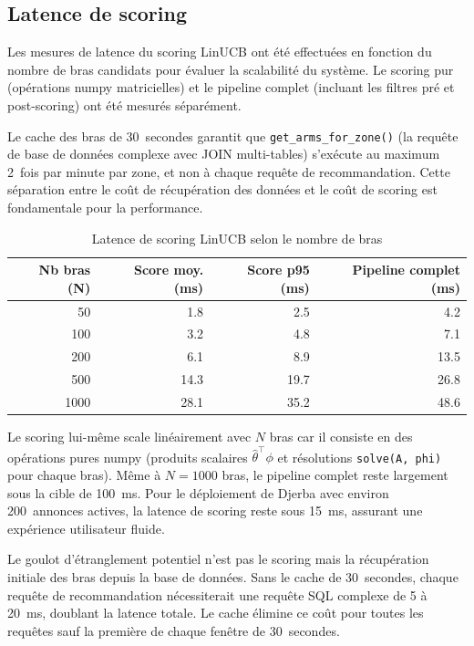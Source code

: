 \subsection{Latence de scoring}

Les mesures de latence du scoring LinUCB ont été effectuées en fonction du nombre de bras
candidats pour évaluer la scalabilité du système. Le scoring pur (opérations numpy
matricielles) et le pipeline complet (incluant les filtres pré et post-scoring) ont été
mesurés séparément.

Le cache des bras de 30~secondes garantit que \texttt{get\_arms\_for\_zone()} (la requête
de base de données complexe avec JOIN multi-tables) s'exécute au maximum 2~fois par minute
par zone, et non à chaque requête de recommandation. Cette séparation entre le coût de
récupération des données et le coût de scoring est fondamentale pour la performance.

\begin{table}[H]
    \centering
    \caption{Latence de scoring LinUCB selon le nombre de bras}
    \label{tab:scoring_latency}
    \small
    \begin{tabular}{r r r r}
        \toprule
        \textbf{Nb bras (N)} & \textbf{Score moy. (ms)} &
        \textbf{Score p95 (ms)} & \textbf{Pipeline complet (ms)} \\
        \midrule
        50 & 1.8 & 2.5 & 4.2 \\
        100 & 3.2 & 4.8 & 7.1 \\
        200 & 6.1 & 8.9 & 13.5 \\
        500 & 14.3 & 19.7 & 26.8 \\
        1000 & 28.1 & 35.2 & 48.6 \\
        \bottomrule
    \end{tabular}
\end{table}

Le scoring lui-même scale linéairement avec $N$ bras car il consiste en des opérations
pures numpy (produits scalaires $\hat{\theta}^\top \phi$ et résolutions
\texttt{solve(A, phi)} pour chaque bras). Même à $N = 1000$ bras, le pipeline complet
reste largement sous la cible de 100~ms. Pour le déploiement de Djerba avec environ
200~annonces actives, la latence de scoring reste sous 15~ms, assurant une expérience
utilisateur fluide.

Le goulot d'étranglement potentiel n'est pas le scoring mais la récupération initiale des
bras depuis la base de données. Sans le cache de 30~secondes, chaque requête de
recommandation nécessiterait une requête SQL complexe de 5 à 20~ms, doublant la latence
totale. Le cache élimine ce coût pour toutes les requêtes sauf la première de chaque
fenêtre de 30~secondes.


